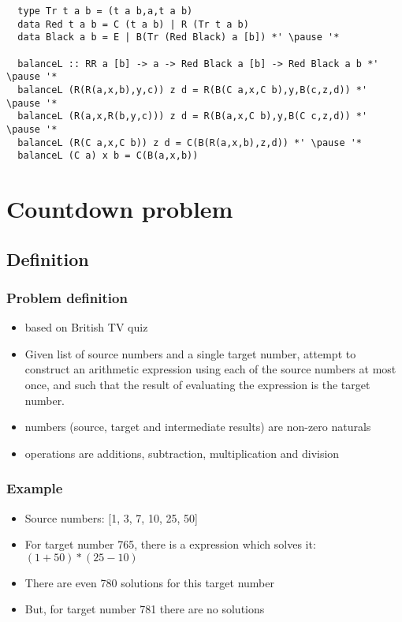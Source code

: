 \documentclass[aspectratio=43]{beamer}
\begin{document}
\begin{frame}[fragile]
 \begin{lstlisting}
  type Tr t a b = (t a b,a,t a b)
  data Red t a b = C (t a b) | R (Tr t a b)
  data Black a b = E | B(Tr (Red Black) a [b]) *' \pause '*
  
  balanceL :: RR a [b] -> a -> Red Black a [b] -> Red Black a b *' \pause '*
  balanceL (R(R(a,x,b),y,c)) z d = R(B(C a,x,C b),y,B(c,z,d)) *' \pause '*
  balanceL (R(a,x,R(b,y,c))) z d = R(B(a,x,C b),y,B(C c,z,d)) *' \pause '*
  balanceL (R(C a,x,C b)) z d = C(B(R(a,x,b),z,d)) *' \pause '*
  balanceL (C a) x b = C(B(a,x,b))
 \end{lstlisting}
\end{frame}








    
    
    







\section{Countdown problem}

\subsection{Definition}

\begin{frame}
 \frametitle{Problem definition}
 \begin{itemize}
  \item based on British TV quiz
  \item Given list of source numbers and a single target number, attempt to construct an arithmetic expression using each of the source numbers at most once, and such that the result of evaluating the expression is the target number.
  \item numbers (source, target and intermediate results) are non-zero naturals
  \item operations are additions, subtraction, multiplication and division
 \end{itemize}
\end{frame}

\begin{frame}
 \frametitle{Example}
 \begin{itemize}
  \item Source numbers: [1, 3, 7, 10, 25, 50]
  \item For target number 765, there is a expression which solves it: $(1 + 50)*(25 - 10)$
  \item There are even 780 solutions for this target number
  \item But, for target number 781 there are no solutions
 \end{itemize}
\end{frame}
\end{document}
